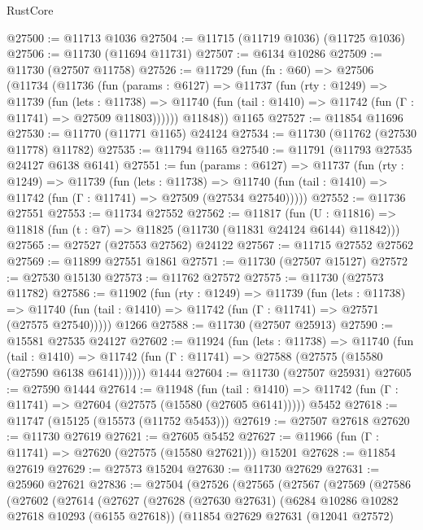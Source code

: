 \begin{lexlean}{RustCore}
\begin{coremodule}
@27500 := @11713 @1036
@27504 := @11715 (@11719 @1036) (@11725 @1036)
@27506 := @11730 (@11694 @11731)
@27507 := @6134 @10286
@27509 := @11730 (@27507 @11758)
@27526 := @11729
    (fun (fn : @60) =>
    @27506
      (@11734
        (@11736
          (fun (params : @6127) =>
          @11737
            (fun (rty : @1249) =>
            @11739
              (fun (lets : @11738) =>
              @11740 (fun (tail : @1410) => @11742 (fun (Γ : @11741) => @27509 @11803))))))
        @11848))
    @1165
@27527 := @11854 @11696
@27530 := @11770 (@11771 @1165) @24124
@27534 := @11730 (@11762 (@27530 @11778) @11782)
@27535 := @11794 @1165
@27540 := @11791 (@11793 @27535 @24127 @6138 @6141)
@27551 := fun (params : @6127) =>
  @11737
    (fun (rty : @1249) =>
    @11739
      (fun (lets : @11738) =>
      @11740 (fun (tail : @1410) => @11742 (fun (Γ : @11741) => @27509 (@27534 @27540)))))
@27552 := @11736 @27551
@27553 := @11734 @27552
@27562 := @11817
    (fun (U : @11816) => @11818 (fun (t : @7) => @11825 (@11730 (@11831 @24124 @6144) @11842)))
@27565 := @27527 (@27553 @27562) @24122
@27567 := @11715 @27552 @27562
@27569 := @11899 @27551 @1861
@27571 := @11730 (@27507 @15127)
@27572 := @27530 @15130
@27573 := @11762 @27572
@27575 := @11730 (@27573 @11782)
@27586 := @11902
    (fun (rty : @1249) =>
    @11739
      (fun (lets : @11738) =>
      @11740 (fun (tail : @1410) => @11742 (fun (Γ : @11741) => @27571 (@27575 @27540)))))
    @1266
@27588 := @11730 (@27507 @25913)
@27590 := @15581 @27535 @24127
@27602 := @11924
    (fun (lets : @11738) =>
    @11740
      (fun (tail : @1410) =>
      @11742 (fun (Γ : @11741) => @27588 (@27575 (@15580 (@27590 @6138 @6141))))))
    @1444
@27604 := @11730 (@27507 @25931)
@27605 := @27590 @1444
@27614 := @11948
    (fun (tail : @1410) => @11742 (fun (Γ : @11741) => @27604 (@27575 (@15580 (@27605 @6141)))))
    @5452
@27618 := @11747 (@15125 (@15573 (@11752 @5453)))
@27619 := @27507 @27618
@27620 := @11730 @27619
@27621 := @27605 @5452
@27627 := @11966 (fun (Γ : @11741) => @27620 (@27575 (@15580 @27621))) @15201
@27628 := @11854 @27619
@27629 := @27573 @15204
@27630 := @11730 @27629
@27631 := @25960 @27621
@27836 := @27504
    (@27526
      (@27565
        (@27567
          (@27569
            (@27586
              (@27602
                (@27614
                  (@27627
                    (@27628
                      (@27630 @27631)
                      (@6284 @10286 @10282 @27618 @10293 (@6155 @27618))
                      (@11854
                        @27629
                        @27631
                        (@12041 @27572)

\end{coremodule}
\end{lexlean}
